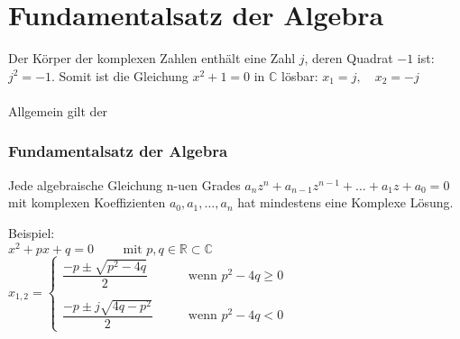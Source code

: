\section{Fundamentalsatz der Algebra}
Der Körper der komplexen Zahlen enthält eine Zahl $j$, deren Quadrat $-1$ ist: $j^2 = -1$. Somit ist die Gleichung $x^2 + 1 = 0$ in $\mathbb{C}$ lösbar: $x_1 = j, \quad x_2 = -j$\\\\
Allgemein gilt der
\subsubsection{Fundamentalsatz der Algebra}
\begin{framed}\noindent
  Jede algebraische Gleichung n-uen Grades $a_n z^n + a_{n-1} z^{n-1} + \dots + a_1 z + a_0 = 0$ mit komplexen Koeffizienten $a_0, a_1, \dots, a_n$ hat mindestens eine Komplexe Lösung. 
\end{framed}
Beispiel: \\
$x^2 + px + q = 0 \qquad \text{ mit }p, q \in \mathbb{R} \subset \mathbb{C}$\\
$x_{1, 2} = \left\{ \begin{matrix}
  \dfrac{-p \pm \sqrt{p^2 - 4 q}}{2} \qquad & \text{wenn } p^2 - 4 q \geq 0\\\\
  \dfrac{-p \pm j \sqrt{4 q - p^2}}{2} \qquad & \text{wenn } p^2 - 4 q < 0
\end{matrix} \right.$